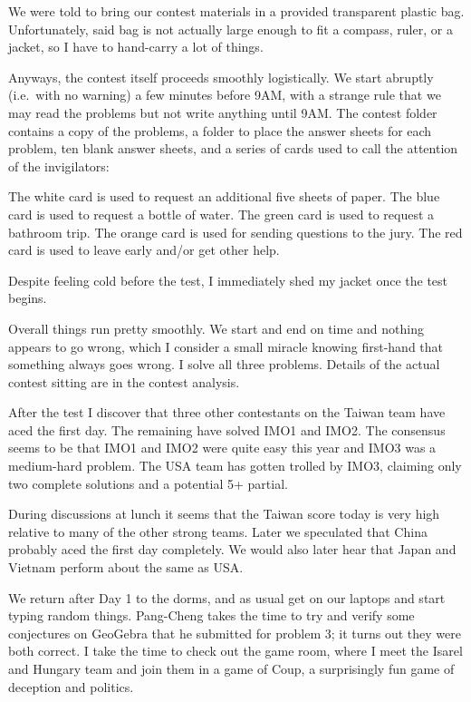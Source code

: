 \documentclass[11pt]{scrreprt}
\numberwithin{figure}{chapter}
\begin{document}
We were told to bring our contest materials in a provided transparent plastic bag.
Unfortunately, said bag is not actually large enough to fit a compass, ruler, or a jacket,
so I have to hand-carry a lot of things.

Anyways, the contest itself proceeds smoothly logistically.
We start abruptly (i.e.\ with no warning) a few minutes before 9AM,
with a strange rule that we may read the problems but not write anything until 9AM.
The contest folder contains a copy of the problems, a folder to place the answer sheets for each problem,
ten blank answer sheets, and a series of cards used to call the attention of the invigilators:
\begin{itemize}
  \ii The white card is used to request an additional five sheets of paper.
  \ii The blue card is used to request a bottle of water.
  \ii The green card is used to request a bathroom trip.
  \ii The orange card is used for sending questions to the jury.
  \ii The red card is used to leave early and/or get other help.
\end{itemize}
Despite feeling cold before the test, I immediately shed my jacket once the test begins.

Overall things run pretty smoothly.
We start and end on time and nothing appears to go wrong,
which I consider a small miracle knowing first-hand that something always goes wrong.
I solve all three problems.
Details of the actual contest sitting are in the contest analysis.

After the test I discover that three other contestants on the Taiwan team have aced the first day.
The remaining have solved IMO1 and IMO2.
The consensus seems to be that IMO1 and IMO2 were quite easy this year and IMO3 was a medium-hard problem.
The USA team has gotten trolled by IMO3, claiming only two complete solutions and a potential 5+ partial.

During discussions at lunch it seems that the Taiwan score today is very high
relative to many of the other strong teams.
Later we speculated that China probably aced the first day completely.
We would also later hear that Japan and Vietnam perform about the same as USA.

We return after Day 1 to the dorms, and as usual get on our laptops and start typing random things.
Pang-Cheng takes the time to try and verify some conjectures on GeoGebra
that he submitted for problem 3; it turns out they were both correct.
I take the time to check out the game room,
where I meet the Isarel and Hungary team and join them in a game of Coup,
a surprisingly fun game of deception and politics.
\end{document}
